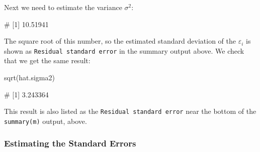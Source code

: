 \documentclass[
  a4paper,
]{article}
\newenvironment{Shaded}{\begin{snugshade}}{\end{snugshade}}
\newcommand{\DecValTok}[1]{\textcolor[rgb]{0.00,0.00,0.81}{#1}}
\newcommand{\FunctionTok}[1]{\textcolor[rgb]{0.00,0.00,0.00}{#1}}
\newcommand{\NormalTok}[1]{#1}
\newcommand{\OtherTok}[1]{\textcolor[rgb]{0.56,0.35,0.01}{#1}}
\newcommand{\SpecialCharTok}[1]{\textcolor[rgb]{0.00,0.00,0.00}{#1}}
\theoremstyle{definition}
\theoremstyle{definition}
\theoremstyle{definition}
\theoremstyle{definition}
\theoremstyle{remark}
\begin{document}
Next we need to estimate the variance \(\sigma^2\):

\begin{Shaded}
\end{Shaded}

\begin{Shaded}
\begin{Highlighting}[]
\NormalTok{\# [1] 10.51941}
\end{Highlighting}
\end{Shaded}

The square root of this number, so the estimated standard deviation of the
\(\varepsilon_i\) is shown as \texttt{Residual\ standard\ error} in the summary output above.
We check that we get the same result:

\begin{Shaded}
\begin{Highlighting}[]
\FunctionTok{sqrt}\NormalTok{(hat.sigma2)}
\end{Highlighting}
\end{Shaded}

\begin{Shaded}
\begin{Highlighting}[]
\NormalTok{\# [1] 3.243364}
\end{Highlighting}
\end{Shaded}

This result is also listed as the \texttt{Residual\ standard\ error} near the
bottom of the \texttt{summary(m)} output, above.

\hypertarget{estimating-the-standard-errors}{%
\subsubsection{Estimating the Standard Errors}\label{estimating-the-standard-errors}}
\end{document}
